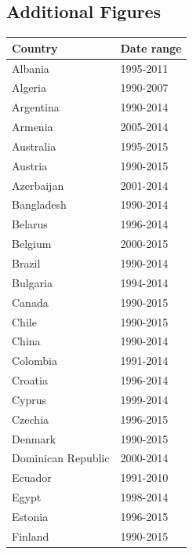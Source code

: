 \documentclass[12pt,a4paper]{article}
\begin{document}
\subsection{Additional Figures}\label{sec:graph_appendix}

\renewcommand{\arraystretch}{1}
\begin{table}[htbp]
\centering
\begin{subtable}{0.45\textwidth}
\centering
\begin{tabular}{ll}
\toprule
   Country & Date range \\
\midrule
                   Albania &  1995-2011 \\
                   Algeria &  1990-2007 \\
                 Argentina &  1990-2014 \\
                   Armenia &  2005-2014 \\
                 Australia &  1995-2015 \\
                   Austria &  1990-2015 \\
                Azerbaijan &  2001-2014 \\
                Bangladesh &  1990-2014 \\
                   Belarus &  1996-2014 \\
                   Belgium &  2000-2015 \\
                    Brazil &  1990-2014 \\
                  Bulgaria &  1994-2014 \\
                    Canada &  1990-2015 \\
                     Chile &  1990-2015 \\
                     China &  1990-2014 \\
                  Colombia &  1991-2014 \\
                   Croatia &  1996-2014 \\
                    Cyprus &  1999-2014 \\
                   Czechia &  1996-2015 \\
                   Denmark &  1990-2015 \\
        Dominican Republic &  2000-2014 \\
                   Ecuador &  1991-2010 \\
                     Egypt &  1998-2014 \\
                   Estonia &  1996-2015 \\
                   Finland &  1990-2015 \\

\end{tabular}
\end{subtable}
\end{table}
\end{document}
